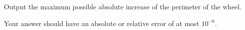 
    Output the maximum possible absolute increase of the perimeter of the wheel.

    Your answer should have an absolute or relative error of at most $10^{-6}$.
